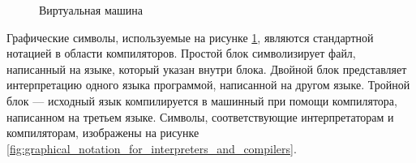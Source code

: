 \begin{figure}[ch]
	\caption{\label{fig:virtual_machine}Виртуальная машина}
\end{figure}

Графические символы, используемые на рисунке \ref{fig:virtual_machine}, являются
стандартной нотацией в области компиляторов. Простой блок символизирует файл,
написанный на языке, который указан внутри блока. Двойной блок представляет
интерпретацию одного языка программой, написанной на другом языке. Тройной блок
--- исходный язык компилируется в машинный при помощи компилятора, написанном на
третьем языке. Символы, соответствующие интерпретаторам и компиляторам,
изображены на рисунке
\ref{fig:graphical_notation_for_interpreters_and_compilers}.

